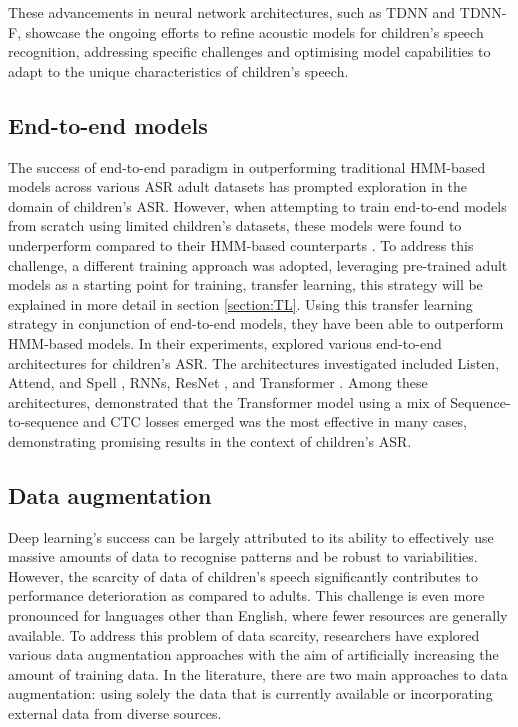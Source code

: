 These advancements in neural network architectures, such as \ac{TDNN} and \ac{TDNN-F}, showcase the ongoing efforts to refine acoustic models for children's speech recognition, addressing specific challenges and optimising model capabilities to adapt to the unique characteristics of children's speech.


\subsection{End-to-end models}
The success of end-to-end paradigm in outperforming traditional \ac{HMM}-based models across various \ac{ASR} adult datasets has prompted exploration in the domain of children's \ac{ASR}. However, when attempting to train end-to-end models from scratch using limited children's datasets, these models were found to underperform compared to their \ac{HMM}-based counterparts \cite{gelin2021endtoend}. To address this challenge, a different training approach was adopted, leveraging pre-trained adult models as a starting point for training, transfer learning, this strategy will be explained in more detail in section \ref{section:TL}. Using this transfer learning strategy in conjunction of end-to-end models, they have been able to outperform \ac{HMM}-based models. In their experiments, \cite{gelin2021endtoend,sri_end2end,chen2020data,ng2020cuhk} explored various end-to-end architectures for children's \ac{ASR}. The architectures investigated included Listen, Attend, and Spell \cite{chan2015listen}, \acp{RNN}, ResNet \cite{targ2016resnet}, and Transformer \cite{Transformer}. Among these architectures, \cite{gelin2021endtoend} demonstrated that the Transformer model using a mix of Sequence-to-sequence and \ac{CTC} losses emerged was the most effective in many cases, demonstrating promising results in the context of children's \ac{ASR}.

\subsection{Data augmentation}%
Deep learning's success can be largely attributed to its ability to effectively use massive amounts of data to recognise patterns  and be robust to variabilities. However, the scarcity of data of children's speech significantly contributes to performance deterioration as compared to adults. This challenge is even more pronounced for languages other than English, where fewer resources are generally available. To address this problem of data scarcity, researchers have explored various data augmentation approaches with the aim of artificially increasing the amount of training data. In the literature, there are two main approaches to data augmentation: using solely the data that is currently available or incorporating external data from diverse sources.

